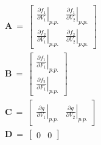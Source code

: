 \documentclass[a4paper,12pt]{article}
\begin{document}
\begin{equation}
   \begin{gathered}
      \boldsymbol{A} ~=~
      \left[
         \begin{array}{cc}
            \left. \frac{\partial f_1}{\partial V_1} \right|_{p.p.} & 
               \left. \frac{\partial f_1}{\partial V_2} \right|_{p.p.}\\[0.2cm]
            \left. \frac{\partial f_2}{\partial V_1} \right|_{p.p.} & 
               \left. \frac{\partial f_2}{\partial V_2} \right|_{p.p.}
         \end{array}
      \right]\\[0.2cm]
      \boldsymbol{B} ~=~
      \left[
         \begin{array}{c}
            \left. \frac{\partial f_1}{\partial F_1} \right|_{p.p.}\\[0.2cm]
            \left. \frac{\partial f_2}{\partial F_1} \right|_{p.p.}
         \end{array}
      \right]\\[0.2cm]
      \boldsymbol{C} ~=~
      \left[
         \begin{array}{cc}
            \left. \frac{\partial g}{\partial V_1} \right|_{p.p.} & 
               \left. \frac{\partial g}{\partial V_2} \right|_{p.p.}
         \end{array}
      \right] \\[0.2cm]
      \boldsymbol{D} ~=~
      \left[
      \begin{array}{cc}
         0 & 0
      \end{array}
      \right]
   \end{gathered}
\end{equation}
\end{document}
